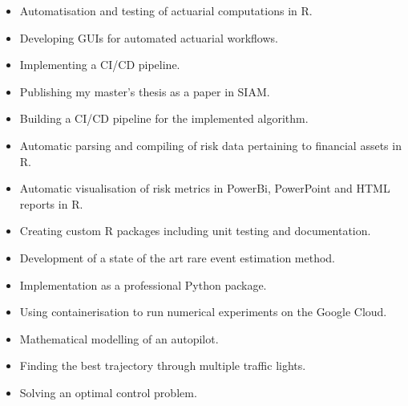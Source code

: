 \begin{itemize}
\item Automatisation and testing of  actuarial computations in R.
\item Developing GUIs for automated actuarial workflows.
\item Implementing a CI/CD pipeline.
\end{itemize}
\quad{}\newline
{}
\begin{itemize}
\item Publishing my master’s thesis as a paper in SIAM.
\item Building a CI/CD pipeline for the implemented algorithm.
\end{itemize}
\quad{}\newline
{}
\begin{itemize}
\item Automatic parsing and compiling of risk data pertaining to financial assets in R.
\item Automatic visualisation of risk metrics in PowerBi, PowerPoint and HTML reports in R.
\item Creating custom R packages including unit testing and documentation.
\end{itemize}
\quad{}\newline
{}
\begin{itemize}
\item Development of a state of the art rare event estimation method.
\item Implementation as a professional Python package.
\item Using containerisation to run numerical experiments on the Google Cloud.
\end{itemize}
\quad{}\newline
{}
\begin{itemize}
\item Mathematical modelling of an autopilot.
\item Finding the best trajectory through multiple traffic lights.
\item Solving an optimal control problem.
\end{itemize}
